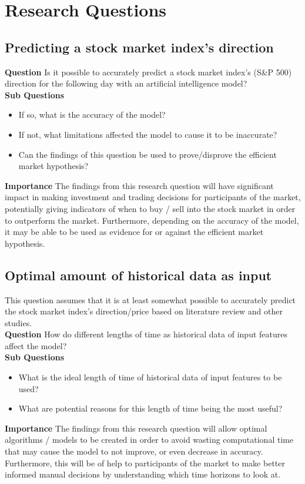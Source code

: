 \chapter{Research Questions} \label{chap:research-questions}


\section{Predicting a stock market index's direction} \label{predicting_direction_question}
\textbf{Question} Is it possible to accurately predict a stock market index's (S\&P 500) direction for
the following day with an artificial intelligence model?\\
\textbf{Sub Questions}
\begin{itemize}
    \item If so, what is the accuracy of the model?
    \item If not, what limitations affected the model to cause it to be inaccurate?
    \item Can the findings of this question be used to prove/disprove the efficient market hypothesis?
\end{itemize}
\textbf{Importance} The findings from this research question will have significant impact in making
investment and trading decisions for participants of the market, potentially giving indicators of
when to buy / sell into the stock market in order to outperform the market. Furthermore, depending
on the accuracy of the model, it may be able to be used as evidence for or against the efficient
market hypothesis.

\section{Optimal amount of historical data as input} \label{optimal_historical_question}
This question assumes that it is at least somewhat possible to accurately predict the stock market index's
direction/price based on literature review and other studies.\\
\textbf{Question} How do different lengths of time as historical data of input features affect the model?\\
\textbf{Sub Questions}
\begin{itemize}
    \item What is the ideal length of time of historical data of input features to be used?
    \item What are potential reasons for this length of time being the most useful?
\end{itemize}
\textbf{Importance} The findings from this research question will allow optimal algorithms /
models to be created in order to avoid wasting computational time that may cause the model to 
not improve, or even decrease in accuracy. Furthermore, this will be of help to participants of
the market to make better informed manual decisions by understanding which time horizons to look
at.

